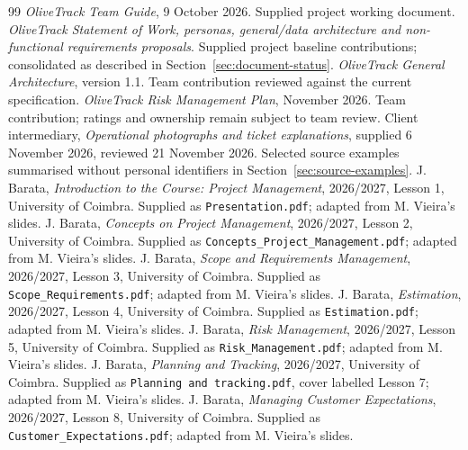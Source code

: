 \FloatBarrier
\clearpage
{}
\begingroup
\raggedright
\begin{thebibliography}{99}
 \emph{OliveTrack Team Guide}, 9 October 2026. Supplied project working document.
 \emph{OliveTrack Statement of Work, personas, general/data architecture and non-functional requirements proposals}. Supplied project baseline contributions; consolidated as described in Section~\ref{sec:document-status}.
 \emph{OliveTrack General Architecture}, version 1.1. Team contribution reviewed against the current specification.
 \emph{OliveTrack Risk Management Plan}, November 2026. Team contribution; ratings and ownership remain subject to team review.
 Client intermediary, \emph{Operational photographs and ticket explanations}, supplied 6 November 2026, reviewed 21 November 2026. Selected source examples summarised without personal identifiers in Section~\ref{sec:source-examples}.
 J. Barata, \emph{Introduction to the Course: Project Management}, 2026/2027, Lesson 1, University of Coimbra. Supplied as \texttt{Presentation.pdf}; adapted from M. Vieira's slides.
 J. Barata, \emph{Concepts on Project Management}, 2026/2027, Lesson 2, University of Coimbra. Supplied as \texttt{Concepts\_Project\_Management.pdf}; adapted from M. Vieira's slides.
 J. Barata, \emph{Scope and Requirements Management}, 2026/2027, Lesson 3, University of Coimbra. Supplied as \texttt{Scope\_Requirements.pdf}; adapted from M. Vieira's slides.
 J. Barata, \emph{Estimation}, 2026/2027, Lesson 4, University of Coimbra. Supplied as \texttt{Estimation.pdf}; adapted from M. Vieira's slides.
 J. Barata, \emph{Risk Management}, 2026/2027, Lesson 5, University of Coimbra. Supplied as \texttt{Risk\_Management.pdf}; adapted from M. Vieira's slides.
 J. Barata, \emph{Planning and Tracking}, 2026/2027, University of Coimbra. Supplied as \texttt{Planning and tracking.pdf}, cover labelled Lesson 7; adapted from M. Vieira's slides.
 J. Barata, \emph{Managing Customer Expectations}, 2026/2027, Lesson 8, University of Coimbra. Supplied as \texttt{Customer\_Expectations.pdf}; adapted from M. Vieira's slides.
\end{thebibliography}
\endgroup
